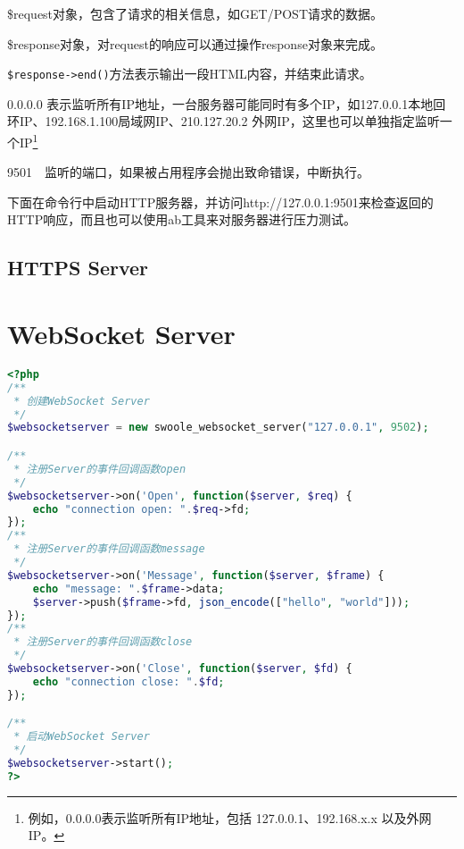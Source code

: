 \begin{compactitem}
\item \$request对象，包含了请求的相关信息，如GET/POST请求的数据。
\item \$response对象，对request的响应可以通过操作response对象来完成。
\end{compactitem}

\texttt{\$response->end()}方法表示输出一段HTML内容，并结束此请求。

\begin{compactitem}
\item 0.0.0.0 表示监听所有IP地址，一台服务器可能同时有多个IP，如127.0.0.1本地回环IP、192.168.1.100局域网IP、210.127.20.2 外网IP，这里也可以单独指定监听一个IP\footnote{例如，0.0.0.0表示监听所有IP地址，包括 127.0.0.1、192.168.x.x 以及外网IP。}
\item 9501~~监听的端口，如果被占用程序会抛出致命错误，中断执行。
\end{compactitem}

下面在命令行中启动HTTP服务器，并访问http://127.0.0.1:9501来检查返回的HTTP响应，而且也可以使用ab工具来对服务器进行压力测试。


\section{HTTPS Server}





\chapter{WebSocket Server}


\begin{lstlisting}[language=PHP]
<?php
/**
 * 创建WebSocket Server
 */
$websocketserver = new swoole_websocket_server("127.0.0.1", 9502);

/**
 * 注册Server的事件回调函数open
 */
$websocketserver->on('Open', function($server, $req) {
    echo "connection open: ".$req->fd;
});
/**
 * 注册Server的事件回调函数message
 */
$websocketserver->on('Message', function($server, $frame) {
    echo "message: ".$frame->data;
    $server->push($frame->fd, json_encode(["hello", "world"]));
});
/**
 * 注册Server的事件回调函数close
 */
$websocketserver->on('Close', function($server, $fd) {
    echo "connection close: ".$fd;
});

/**
 * 启动WebSocket Server
 */
$websocketserver->start();
?>
\end{lstlisting}

